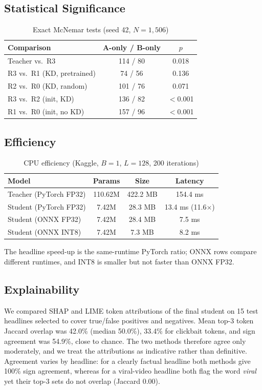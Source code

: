 \documentclass[conference]{IEEEtran}
\begin{document}
\subsection{Statistical Significance}
\begin{table}[htbp]
\caption{Exact McNemar tests (seed 42, $N=1{,}506$)}
\begin{center}
\begin{tabular}{lcc}
\toprule
\textbf{Comparison} & \textbf{A-only / B-only} & \textbf{$p$} \\
\midrule
Teacher vs.\ R3 & 114 / 80 & 0.018 \\
R3 vs.\ R1 (KD, pretrained) & 74 / 56 & 0.136 \\
R2 vs.\ R0 (KD, random) & 101 / 76 & 0.071 \\
R3 vs.\ R2 (init, KD) & 136 / 82 & $<$0.001 \\
R1 vs.\ R0 (init, no KD) & 157 / 96 & $<$0.001 \\
\bottomrule
\end{tabular}
\label{tab:mcnemar}
\end{center}
\end{table}

\subsection{Efficiency}
\begin{table}[htbp]
\caption{CPU efficiency (Kaggle, $B=1$, $L=128$, 200 iterations)}
\begin{center}
\begin{tabular}{lccc}
\toprule
\textbf{Model} & \textbf{Params} & \textbf{Size} & \textbf{Latency} \\
\midrule
Teacher (PyTorch FP32) & 110.62M & 422.2 MB & 154.4 ms \\
Student (PyTorch FP32) & 7.42M & 28.3 MB & 13.4 ms (11.6$\times$) \\
Student (ONNX FP32) & 7.42M & 28.4 MB & 7.5 ms \\
Student (ONNX INT8) & 7.42M & 7.3 MB & 8.2 ms \\
\bottomrule
\end{tabular}
\label{tab:efficiency}
\end{center}
\end{table}
The headline speed-up is the same-runtime PyTorch ratio; ONNX rows compare different runtimes, and INT8 is smaller but not faster than ONNX FP32.

\subsection{Explainability}
We compared SHAP and LIME token attributions of the final student on 15 test headlines selected to cover true/false positives and negatives. Mean top-3 token Jaccard overlap was 42.0\% (median 50.0\%), 33.4\% for clickbait tokens, and sign agreement was 54.9\%, close to chance. The two methods therefore agree only moderately, and we treat the attributions as indicative rather than definitive. Agreement varies by headline: for a clearly factual headline both methods give 100\% sign agreement, whereas for a viral-video headline both flag the word \emph{viral} yet their top-3 sets do not overlap (Jaccard 0.00).
\end{document}
